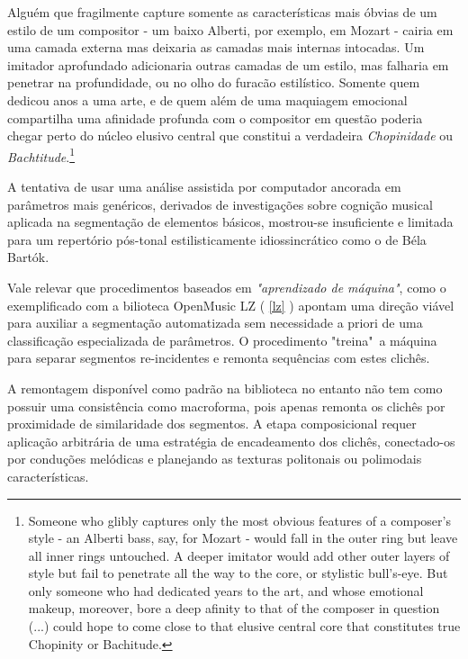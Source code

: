 \documentclass[
	12pt,				%
	openright,			%
	twoside,			%
	a4paper,			%
	english,			%
	french,				%
	spanish,			%
	brazil				%
	]{abntex2}
\begin{document}
\begin{citacao}
Alguém que fragilmente capture somente as características mais óbvias de um estilo de um compositor - um baixo Alberti, por exemplo, em Mozart - cairia em uma camada externa mas deixaria as camadas mais internas intocadas.
Um imitador aprofundado adicionaria outras camadas de um estilo, mas falharia em penetrar na profundidade, ou no olho do furacão estilístico. Somente quem dedicou anos a uma arte, e de quem além de uma maquiagem emocional compartilha uma afinidade profunda com o compositor em questão poderia chegar perto do núcleo elusivo central que constitui a verdadeira \textit{Chopinidade} ou \textit{Bachtitude}.\cite[p. 54]{cope2004virtual}\footnote{Someone who glibly captures only the most obvious features of a composer's style - an Alberti bass, say, for Mozart - would fall in the outer ring but leave all
inner rings untouched. A deeper imitator would add other outer layers of style but fail to penetrate all the way to the core, or stylistic bull's-eye. But only someone who had dedicated years to the art, and whose emotional makeup, moreover, bore a deep afinity to that of the composer in question (...) could hope to come close to that elusive central core that constitutes true Chopinity or Bachitude.\cite[p. 54]{cope2004virtual}}
\end{citacao}


A tentativa de usar uma análise assistida por computador ancorada em parâmetros mais genéricos, derivados de investigações sobre cognição musical aplicada na segmentação de elementos básicos, mostrou-se insuficiente e limitada para um repertório pós-tonal estilisticamente idiossincrático como o de Béla Bartók.

Vale relevar que procedimentos baseados em \textit{"aprendizado de máquina"}, como o exemplificado com a bilioteca OpenMusic LZ ( \autoref{lz} ) apontam uma direção viável para auxiliar a segmentação automatizada sem necessidade a priori de uma classificação especializada de parâmetros. O procedimento "treina"\ a máquina para separar segmentos re-incidentes e remonta sequências com estes clichês. 

A remontagem disponível como padrão na biblioteca no entanto não tem como possuir uma consistência como macroforma, pois apenas remonta os clichês por proximidade de similaridade dos segmentos.
A etapa composicional requer aplicação arbitrária de uma estratégia de encadeamento dos clichês, conectado-os por conduções melódicas e planejando as texturas politonais ou polimodais características.
\end{document}
